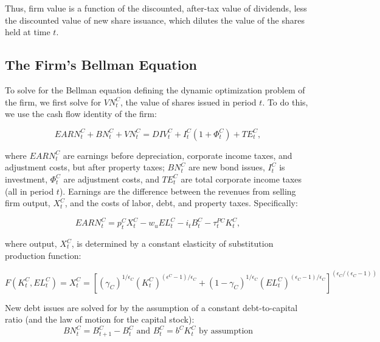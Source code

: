 Thus, firm value is a function of the discounted, after-tax value of dividends, less the discounted value of new share issuance, which dilutes the value of the shares held at time $t$. 

\subsection{The Firm's Bellman Equation}

To solve for the Bellman equation defining the dynamic optimization problem of the firm, we first solve for $VN^{C}_{t}$, the value of shares issued in period $t$.  To do this, we use the cash flow identity of the firm: 

\begin{equation}
\label{eqn:vn}
EARN^{C}_{t}+BN^{C}_{t}+VN^{C}_{t}=DIV^{C}_{t}+I^{C}_{t}(1+\Phi^{C}_{t})+TE^{C}_{t}, 
\end{equation}

where $EARN^{C}_{t}$ are earnings before depreciation, corporate income taxes, and adjustment costs, but after property taxes; $BN^{C}_{t}$ are new bond issues, $I^{C}_{t}$ is investment, $\Phi^{C}_{t}$ are adjustment costs, and $TE^{C}_{t}$ are total corporate income taxes (all in period $t$).  Earnings are the difference between the revenues from selling firm output, $X^{C}_{t}$, and the costs of labor, debt, and property taxes.  Specifically:    

\begin{equation}
\label{eqn:earn}
EARN^{C}_{t}=p^{C}_{t}X^{C}_{t}-w_{u}EL^{C}_{t}-i_{t}B^{C}_{t}-\tau^{PC}_{t}K^{C}_{t},
\end{equation}

\noindent\noindent where output, $X^{C}_{t}$, is determined by a constant elasticity of substitution production function:

\begin{equation}
\label{eqn:prod_fun}
F(K^{C}_{t},EL^{C}_{t})=X^{C}_{t} = \left[(\gamma_{C})^{1/\epsilon_{C}}(K^{C}_{t})^{(\epsilon^{C}-1)/\epsilon_{C}}+(1-\gamma_{C})^{1/\epsilon_{C}}(EL^{C}_{t})^{(\epsilon_{C}-1)/\epsilon_{C}}\right]^{(\epsilon_{C}/(\epsilon_{C}-1))}
\end{equation}

New debt issues are solved for by the assumption of a constant debt-to-capital ratio (and the law of motion for the capital stock):
\begin{equation}
\label{eqn:debt}
BN^{C}_{t}=B^{C}_{t+1} - B^{C}_{t} \text{ and } B^{C}_{t}=b^{C}K^{C}_{t} \text{ by assumption} 
\end{equation}

